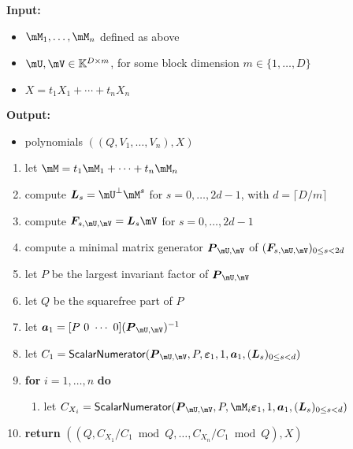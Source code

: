 \documentclass[12pt]{article}
\newcommand{\mat}[1]{\bm{\MakeUppercase{#1}}} %
\newcommand{\row}[1]{\bm{\MakeLowercase{#1}}} %
\newcommand{\col}[1]{\bm{\MakeLowercase{#1}}} %
\newcommand{\seqelt}[1]{\bm{F}_{#1}} %
\newcommand{\minpoly}{P}
\newcommand{\mainalgoname}{\mathsf{ BlockParametrization}}
\newcommand{\lf}{X}
\newcommand{\sqfree}{Q}
\begin{document}
\begin{algorithm}[H]
	\caption{$\mainalgoname(\mM_1,\dots,\mM_n,\mU,\mV,\lf)$}
	{\bf Input:} \vspace{-0.5em}
	\begin{itemize}
		\item $\mM_1,\dots,\mM_n$ defined as above
		\item  $\mU,\mV \in \mathbb{K}^{D \times m}$, for some block dimension  $m \in \{1,\dots,D\}$
                \item $\lf =t_1 X_1 + \cdots + t_n X_n$
	\end{itemize}
	{\bf Output:}  \vspace{-0.5em}
        \begin{itemize}
        \item         polynomials $((\sqfree,V_1,\dots,V_n),\lf)$
        \end{itemize}
  \begin{enumerate}
  \item\label{mainstep1}   let $\mM = t_1 \mM_1 + \cdots + t_n \mM_n$
  \item\label{mainstep3} { compute $\mat{L}_s = \mU^{\perp}\mM^s$ for $s=0,\dots,2d-1$, with $d = \lceil D/m \rceil$}
  \item\label{mainstep4} { compute $\seqelt{s,\mU,\mV}= \mat{L}_s\mV$ for $s=0,\dots, 2d-1$}
  \item\label{mainstep5} { compute a minimal matrix generator $\mat{P}_{\mU,\mV}$ of $(\seqelt{s,\mU,\mV})_{0 \le s < 2d}$}
  \item\label{mainstep6} { let $\minpoly$ be the largest invariant factor of $\mat{P}_{\mU,\mV}$}
  \item\label{mainstep7} { let $\sqfree$ be  the squarefree part  of $\minpoly$}
  \item\label{mainstep8} { let $\row{a}_1 = [P~0 ~\cdots~ 0] (\mat{P}_{\mU,\mV})^{-1}$}
  \item\label{mainstep9}  let $C_1 = \mathsf{{\sf ScalarNumerator}}(\mat{P}_{\mU,\mV}, \minpoly, \col{\varepsilon}_1, 1, \row{a}_1, 
    (\mat{L}_s)_{0 \le s < d})$
  \item\label{mainstep10} \textbf{for} $i=1,\dots,n$ \textbf{do}
    \begin{enumerate}
     \item let $C_{X_i} = \mathsf{{\sf ScalarNumerator}}(\mat{P}_{\mU,\mV}, \minpoly, \mM_i\col{\varepsilon}_1, 1, \row{a}_1, (\mat{L}_s)_{0 \le s < d})$
    \end{enumerate}
\item\label{mainstep11}     \textbf{return} $((\sqfree, C_{X_1}/ C_1 \bmod \sqfree, \dots, C_{X_n}/ C_{1} \bmod \sqfree),\lf)$
  \end{enumerate}  \label{algo:block-sparse-fglm}
\end{algorithm}
\end{document}
